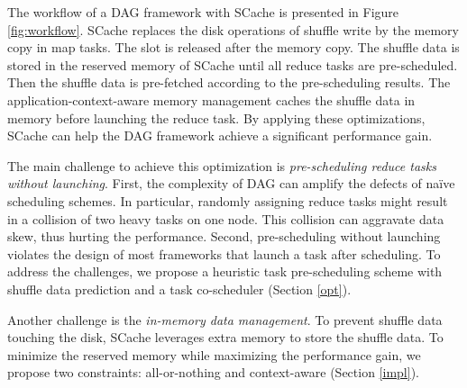 The workflow of a DAG framework with SCache is presented in Figure \ref{fig:workflow}. 
SCache replaces the disk operations of shuffle write by the memory copy in map tasks. 
The slot is released after the memory copy. 
The shuffle data is stored in the reserved memory of SCache until all reduce tasks are pre-scheduled. 
Then the shuffle data is pre-fetched according to the pre-scheduling results.  
The application-context-aware memory management caches the shuffle data in memory before launching the reduce task.
By applying these optimizations, SCache can help the DAG framework achieve a significant performance gain.  

The main challenge to achieve this optimization is \textit{pre-scheduling reduce tasks without launching}. 
First, the complexity of DAG can amplify the defects of na\"{i}ve scheduling schemes. 
In particular, randomly assigning reduce tasks might result in a collision of two heavy tasks on one node. 
This collision can aggravate data skew, thus hurting the performance. 
Second, pre-scheduling without launching violates the design of most frameworks that launch a task after scheduling.
To address the challenges, we propose a heuristic task pre-scheduling scheme with shuffle data prediction and a task co-scheduler (Section \ref{opt}).

Another challenge is the \textit{in-memory data management}. 
To prevent shuffle data touching the disk, SCache leverages extra memory to store the shuffle data. 
To minimize the reserved memory while maximizing the performance gain, we propose two constraints: all-or-nothing and context-aware (Section \ref{impl}).

